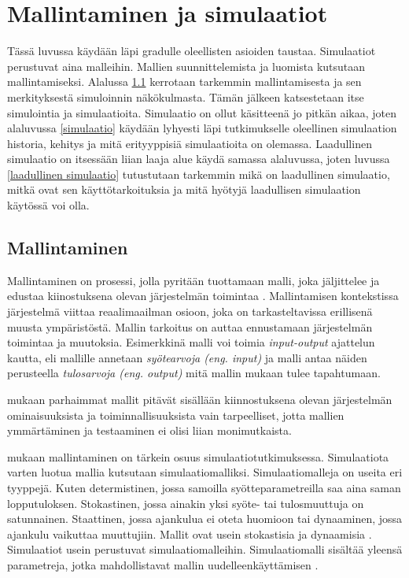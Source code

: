 \documentclass[utf8]{gradu3}
\begin{document}
\chapter{Mallintaminen ja simulaatiot}
Tässä luvussa käydään läpi gradulle oleellisten asioiden taustaa. 
Simulaatiot perustuvat aina malleihin. Mallien suunnittelemista ja luomista 
kutsutaan mallintamiseksi. Alalussa \ref{mallintaminen} kerrotaan tarkemmin 
mallintamisesta ja sen merkityksestä simuloinnin näkökulmasta. 
Tämän jälkeen katsestetaan itse simulointia ja simulaatioita.
Simulaatio on ollut käsitteenä jo pitkän aikaa, joten alaluvussa
\ref{simulaatio} käydään lyhyesti läpi tutkimukselle oleellinen simulaation historia, 
kehitys ja mitä erityyppisiä simulaatioita on olemassa. 
Laadullinen simulaatio on itsessään liian laaja alue käydä samassa alaluvussa, joten
luvussa \ref{laadullinen simulaatio} tutustutaan tarkemmin 
mikä on laadullinen simulaatio, mitkä ovat sen käyttötarkoituksia 
ja mitä hyötyjä laadullisen simulaation käytössä voi olla.

\section{Mallintaminen} \label{mallintaminen}
Mallintaminen on prosessi, jolla pyritään tuottamaan malli, joka jäljittelee 
ja edustaa kiinostuksena olevan järjestelmän toimintaa \parencite{maria1997introduction}. 
Mallintamisen kontekstissa järjestelmä viittaa reaalimaailman osioon, 
joka on tarkasteltavissa erillisenä muusta ympäristöstä.
Mallin tarkoitus on auttaa ennustamaan järjestelmän toimintaa ja muutoksia.
Esimerkkinä malli voi toimia \textit{input-output} ajattelun kautta, 
eli mallille annetaan \textit{syötearvoja (eng. input)} ja malli antaa näiden perusteella
\textit{tulosarvoja (eng. output)} mitä mallin mukaan tulee tapahtumaan.

\textcite{maria1997introduction} mukaan parhaimmat mallit pitävät 
sisällään kiinnostuksena olevan järjestelmän 
ominaisuuksista ja toiminnallisuuksista vain tarpeelliset, 
jotta mallien ymmärtäminen ja testaaminen ei olisi liian monimutkaista.

\textcite{maria1997introduction} mukaan mallintaminen on tärkein osuus simulaatiotutkimuksessa.
Simulaatiota varten luotua mallia kutsutaan simulaatiomalliksi.
Simulaatiomalleja on useita eri tyyppejä. 
Kuten determistinen, jossa samoilla syötteparametreilla saa aina saman lopputuloksen. 
Stokastinen, jossa ainakin yksi syöte- tai tulosmuuttuja on satunnainen. 
Staattinen, jossa ajankulua ei oteta huomioon tai dynaaminen, 
jossa ajankulu vaikuttaa muuttujiin. Mallit ovat usein stokastisia ja dynaamisia \parencite{maria1997introduction}. 
Simulaatiot usein perustuvat simulaatiomalleihin. Simulaatiomalli sisältää yleensä parametreja,
jotka mahdollistavat mallin uudelleenkäyttämisen \parencite{introduction2005simulation}. 
\end{document}
